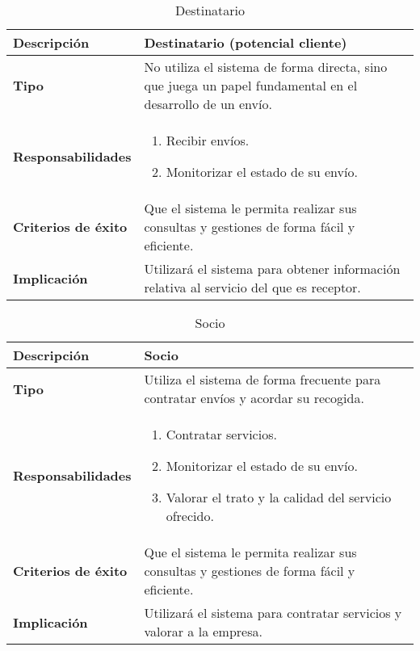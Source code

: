 \documentclass[12pt,spanish]{article}
\begin{document}

\begin{table}[H]
\begin{center}
\begin{tabular}{|l|m{11cm}|}
\hline
\textbf{Descripción} & Destinatario (potencial cliente) \\
\hline
\textbf{Tipo} & No utiliza el sistema de forma directa, sino que juega un papel fundamental en el desarrollo de un envío. \\
\hline
\textbf{Responsabilidades} & 
\begin{minipage}{11cm}
    \vskip 1pt
    \begin{enumerate}
   \item Recibir envíos.
   \item Monitorizar el estado de su envío.
   \end{enumerate}
   \vskip 1pt
 \end{minipage}\\ 
\hline
\textbf{Criterios de éxito} & Que el sistema le permita realizar sus consultas y gestiones de forma fácil y eficiente.\\
\hline
\textbf{Implicación} & Utilizará el sistema para obtener información relativa al servicio del que es receptor. \\
\hline
\end{tabular}
\caption{Destinatario}
\end{center}
\end{table}


\begin{table}[H]
\begin{center}
\begin{tabular}{|l|m{11cm}|}
\hline
\textbf{Descripción} & Socio \\
\hline
\textbf{Tipo} & Utiliza el sistema de forma frecuente para contratar envíos y acordar su recogida. \\
\hline
\textbf{Responsabilidades} & 
\begin{minipage}{11cm}
    \vskip 1pt
    \begin{enumerate}
   		\item Contratar servicios.
   		\item Monitorizar el estado de su envío.
     	\item Valorar el trato y la calidad del servicio ofrecido.
   \end{enumerate}
   \vskip 1pt
 \end{minipage}\\ 
\hline
\textbf{Criterios de éxito} & Que el sistema le permita realizar sus consultas y gestiones de forma fácil y eficiente.\\
\hline
\textbf{Implicación} & Utilizará el sistema para contratar servicios y valorar a la empresa. \\
\hline
\end{tabular}
\caption{Socio}
\end{center}
\end{table}
\end{document}
